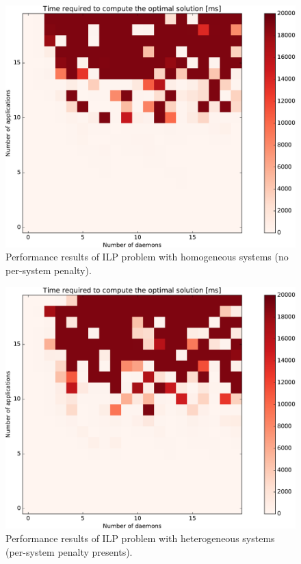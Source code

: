 \begin{figure}[t]
    \centerline 
{\includegraphics[scale=0.4]{img/ilp-1-cropped.pdf}}
    \caption[DistRib ILP performance (no per-system penalty)]{Performance results of ILP problem with homogeneous systems (no
    per-system penalty).}
    \label{fig:cap5-ilp_nopen}
\end{figure}


\begin{figure}[t]
    \centerline 
{\includegraphics[scale=0.4]{img/ilp-2-cropped.pdf}}
    \caption[DistRib ILP performance (per-system penalty)]{Performance results of ILP problem with heterogeneous systems 
    (per-system penalty presents).}
    \label{fig:cap5-ilp_pen}
\end{figure}

